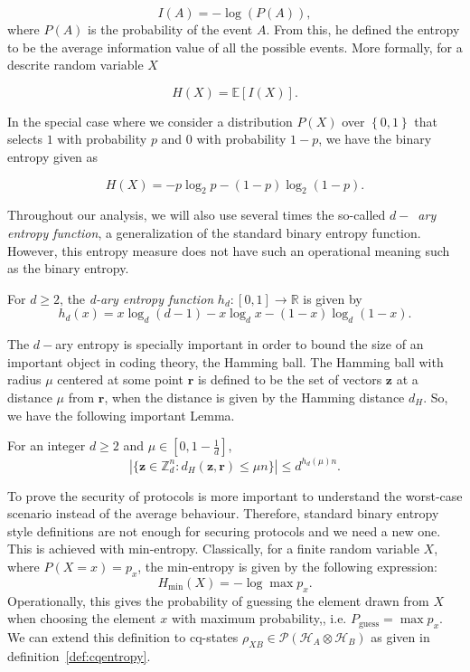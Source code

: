 $$I(A) = - \log \left( P(A) \right),$$
where $P(A)$ is the probability of the event $A$. From this, he defined the entropy to be the average information value of all the possible events. More formally, for a descrite random variable $X$

$$H(X) = \mathbb{E}\left[ I(X) \right].$$

In the special case where we consider a distribution $P(X)$ over $\left\{0,1\right\}$ that selects $1$ with probability $p$ and $0$ with probability $1-p$, we have the binary entropy given as

$$H(X) = -p \log_2 p - (1-p)\log_2(1-p).$$

Throughout our analysis, we will also use several times the so-called $d-$~\textit{ary entropy function}, a generalization of the standard binary entropy function. However, this entropy measure does not have such an operational meaning such as the binary entropy.
\begin{definition}
For $d\geq 2$, the \textit{d-ary entropy function} $h_d : [0,1]\rightarrow\mathbb{R}$ is given by
\begin{equation*}
    h_d(x) = x \log_d(d-1) - x \log_d x - (1-x) \log_d (1-x).
\end{equation*}
\label{def:q-ary}
\end{definition}
The $d-$ary entropy is specially important in order to bound the size of an important object in coding theory, the Hamming ball. The Hamming ball with radius $\mu$ centered at some point $\bm{r}$ is defined to be the set of vectors $\bm{z}$ at a distance $\mu$ from $\bm{r}$, when the distance is given by the Hamming distance $d_H$. So, we have the following important Lemma.

\begin{lemma}
\label{lemma:hammingBall}
For an integer $d\geq 2$ and $\mu \in [0, 1-\frac{1}{d}]$,
\begin{equation*}
    |\{ \boldsymbol{z}\in \mathbb{Z}_d^{n}: d_H(\boldsymbol{z}, \boldsymbol{r})\leq \mu n \}| \leq d^{h_d(\mu)n}.
\end{equation*}
\end{lemma} 

To prove the security of protocols is more important to understand the worst-case scenario instead of the average behaviour. Therefore, standard binary entropy style definitions are not enough for securing protocols and we need a new one. This is achieved with min-entropy. Classically, for a finite random variable $X$, where $P(X=x) = p_x$, the min-entropy is given by the following expression:
$$H_{\min}(X) = -\log \max p_x.$$
Operationally, this gives the probability of guessing the element drawn from $X$ when choosing the element $x$ with maximum probability,, i.e. $P_{\text{guess}} = \max p_x$. We can extend this definition to cq-states $\rho_{XB}\in\mathcal{P}(\mathcal{H}_A \otimes \mathcal{H}_B)$ as given in definition~\ref{def:cqentropy}.

